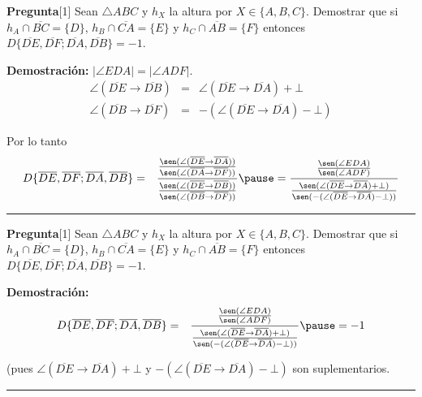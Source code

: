 \documentclass[12pt]{beamer}
\theoremstyle{definition}
\newenvironment{preg}{\begin{block}{\textbf{Pregunta}}}{\end{block}}
\newenvironment{dem}{\noindent\textbf{Demostración:}}{\begin{flushright}
\rule{1ex}{1ex} \end{flushright}}
\begin{document}
\begin{frame}
\begin{preg}[1]
Sean $\triangle ABC$ y $h_X$ la altura por $X \in \{A,B,C\}$. Demostrar que si $h_A \cap \overline{BC}=\{D\}$, $h_B \cap \overline{CA}=\{E\}$ y $h_C \cap \overline{AB}=\{F\}$ entonces $D\{\overline{DE},\overline{DF};\overline{DA},\overline{DB}\} = -1$.
\end{preg}

\begin{dem}
$|\angle EDA| = |\angle ADF|$.
\begin{eqnarray*}
\angle( \overline{DE} \rightarrow \overline{DB}) &=& \angle (\overline{DE} \rightarrow \overline{DA}) + \bot\\
\angle(\overline{DB} \rightarrow \overline{DF}) &=& - (\angle (\overline{DE} \rightarrow \overline{DA})-\bot)
\end{eqnarray*}
\pause

Por lo tanto
\begin{eqnarray*}
D\{\overline{DE}, \overline{DF} ; \overline{DA}, \overline{DB}\} &=& \frac{\frac{\sen (\angle (\overline{DE} \rightarrow \overline{DA}))}{\sen (\angle (\overline{DA} \rightarrow \overline{DF}))}}{\frac{\sen (\angle (\overline{DE} \rightarrow \overline{DB}))}{\sen (\angle (\overline{DB} \rightarrow \overline{DF}))}} \pause = \frac{\frac{\sen (\angle EDA)}{\sen (\angle ADF)}}{\frac{\sen (\angle (\overline{DE} \rightarrow \overline{DA}) + \bot)}{\sen (- (\angle (\overline{DE} \rightarrow \overline{DA}) -\bot))}}
\end{eqnarray*}
\vspace{2cm}
\end{dem}
\end{frame}


\begin{frame}
\begin{preg}[1]
Sean $\triangle ABC$ y $h_X$ la altura por $X \in \{A,B,C\}$. Demostrar que si $h_A \cap \overline{BC}=\{D\}$, $h_B \cap \overline{CA}=\{E\}$ y $h_C \cap \overline{AB}=\{F\}$ entonces $D\{\overline{DE},\overline{DF};\overline{DA},\overline{DB}\} = -1$.
\end{preg}

\begin{dem}
\begin{eqnarray*}
D\{\overline{DE}, \overline{DF} ; \overline{DA}, \overline{DB}\} &=& \frac{\frac{\sen (\angle EDA)}{\sen (\angle ADF)}}{\frac{\sen (\angle (\overline{DE} \rightarrow \overline{DA}) + \bot)}{\sen (- (\angle (\overline{DE} \rightarrow \overline{DA}) -\bot))}} \pause = -1 
\end{eqnarray*}
\pause

(pues $\angle (\overline{DE} \rightarrow \overline{DA}) + \bot$ y $-(\angle (\overline{DE} \rightarrow \overline{DA}) - \bot)$ son suplementarios.
\pause
\end{dem}
\end{frame}
\end{document}
